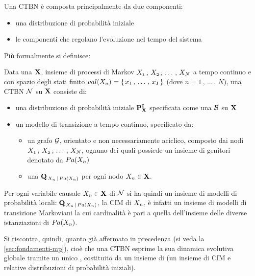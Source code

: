Una \acs{CTBN} è composta principalmente da due componenti:
\begin{itemize}
    \item una distribuzione di probabilità iniziale
    \item le componenti che regolano l'evoluzione nel tempo del sistema
\end{itemize}
Più formalmente si definisce:
\begin{definizione}
\label{defn:ctbn}
Data una \pv{} $\mathbf{X}$, insieme di processi di Markov $\mathnormal{X_1}\,,\,\mathnormal{X_2}\,,\,\dotsc\,,\,\mathnormal{X_N}$ a tempo continuo e con spazio degli stati finito $val(\mathnormal{X_n})=\{\,\mathrm{\mathnormal{x}_1}\,,\,\dotsc\,,\,\mathrm{\mathnormal{x}_J}\,\}$ (dove $n=1\,,\,\dotsc\,,\,N$), una \acs{CTBN} $\mathcal{N}$ su $\mathbf{X}$ consiste di:
\begin{itemize}
    \item una distribuzione di probabilità iniziale $\mathbf{P}^0_{\mathbf{X}}$ specificata come una \bn{} $\mathcal{B}$ su $\mathbf{X}$
    \item un modello di transizione a tempo continuo, specificato da:
    \begin{itemize}
        \item un grafo $\mathcal{G}$, orientato e non necessariamente aciclico, composto dai nodi $\mathnormal{X_1}\,,\,\mathnormal{X_2}\,,\,\dotsc\,,\,\mathnormal{X_N}$, ognuno dei quali possiede un insieme di genitori denotato da $Pa(\mathnormal{X_n})$
        \item una \im*{} \cond*{} $\mathbf{Q}_{\,\mathnormal{X_n}\,\arrowvert\,Pa(\mathnormal{X_n})}$ per ogni nodo $\mathnormal{X_n} \in \mathbf{X}$.
    \end{itemize}
\end{itemize}
\end{definizione}

Per ogni variabile causale $\mathnormal{X_n} \in \mathbf{X}$ di $\mathcal{N}$ si ha quindi un insieme di modelli di probabilità locali: $\mathbf{Q}_{\,\mathnormal{X_n}\,\arrowvert\,Pa(\mathnormal{X_n})}$, la \acs{CIM} di $\mathnormal{X_n}$, è infatti un insieme di modelli di transizione Markoviani la cui cardinalità è pari a quella dell'insieme delle diverse istanziazioni di $Pa(\mathnormal{X_n})$.

Si riscontra, quindi, quanto già affermato in precedenza (si veda la \vref{sec:fondamenti-mp}), cioè che una \acs{CTBN} esprime la sua dinamica evolutiva globale tramite un unico \mprocess*{} \omog*{}, costituito da un insieme di \mprocess{} \cond{} (un insieme di \acs{CIM} e relative distribuzioni di probabilità iniziali).

